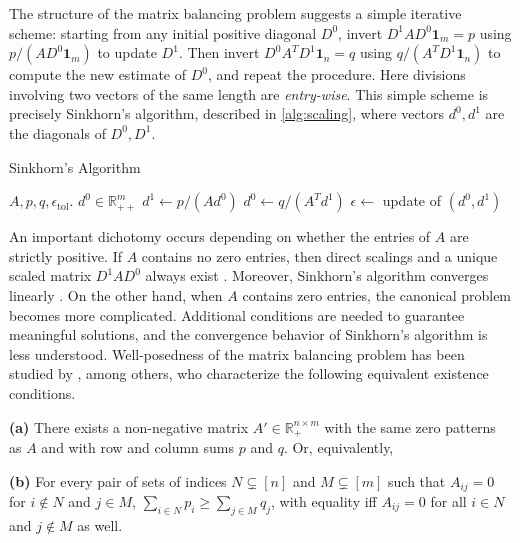  The structure of the matrix balancing problem suggests a simple iterative scheme: starting
from any initial positive diagonal $D^{0}$, invert $D^{1}AD^{0}\mathbf{1}_m = p$ using $p/(AD^{0}\mathbf{1}_m)$
 to update $D^{1}$. Then invert $D^{0}A^{T}D^{1}\mathbf{1}_n=q$ using  $q/(A^{T}D^{1}\mathbf{1}_n)$ to compute the new estimate of $D^{0}$, and repeat the procedure. Here divisions involving two vectors of the same length are \emph{entry-wise}. This simple scheme is precisely Sinkhorn's algorithm, described in \cref{alg:scaling}, where vectors $d^0,d^1$ are the diagonals of $D^0,D^1$.
 \begin{algorithm}[tb]
\caption{Sinkhorn's Algorithm}
   \label{alg:scaling}
\begin{algorithmic}
     $A, p, q,\epsilon_{\text{tol}}$.
    $d^{0}\in\mathbb{R}_{++}^{m}$
   \REPEAT
   \STATE $d^{1} \leftarrow  p/( A d^0)$ 
   \STATE $d^{0}\leftarrow  q/({A}^{T} d^{1})$
   \STATE 
$\epsilon\leftarrow$  update of $(d^{0},d^1)$
\end{algorithmic}
\end{algorithm}
An important dichotomy occurs depending on whether the entries of $A$ are strictly positive. If $A$ contains no zero entries, then direct scalings and a unique scaled matrix $D^1AD^0$ always exist \citep{sinkhorn1964relationship}. Moreover, Sinkhorn's algorithm converges linearly \citep{franklin1989scaling}. 
On the other hand, when $A$ contains zero entries, the canonical problem becomes more complicated. Additional conditions are needed to guarantee meaningful solutions, and the convergence behavior of Sinkhorn's algorithm is less understood.  Well-posedness of the matrix balancing problem has been studied by \citet{brualdi1968convex,sinkhorn1974diagonal,pukelsheim2009iterative}, among others, who characterize the following equivalent existence conditions.
\begin{assumption}
\label{ass:matrix-existence}
\textbf{(a)} There exists a non-negative matrix $A'\in \mathbb{R}_+^{n\times m}$ with the same zero patterns as $A$ and with row and column sums $p$ and $q$. Or, equivalently,

\textbf{(b)} For every pair of sets of indices $N \subsetneq [n]$ and $M \subsetneq [m]$ such that $A_{ij}=0$ for $i\notin N$ and $j\in M$, $\sum_{i\in N}p_i \geq \sum_{j\in M}q_j$, with equality iff $A_{ij}=0$ for all $i \in N$ and $j \notin M$ as well.
\end{assumption} 
